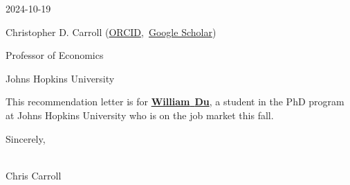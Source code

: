 \documentclass[titlepage, headings=optiontotocandhead]{article} %
\newcommand{\firstname}{William}
\newcommand{\lastname}{Du}
\begin{document}


\begin{flushright}
2024-10-19
\end{flushright}

\vspace*{-1mm}
\noindent Christopher D. Carroll (\href{https://orcid.org/0000-0003-3732-9312}{ORCID},~\href{https://scholar.google.com/citations?user=JY7jfgsAAAAJ}{Google Scholar})

\noindent Professor of Economics

\noindent Johns Hopkins University

\oddsidemargin 0in \textwidth 6.4in \topmargin 0in \textheight 8.8in
\pagestyle{empty}
\noindent
\small


\medskip\medskip
This recommendation letter is for \href{https://www.william-du.com}{\textbf{\firstname}~\textbf{\lastname}}, a student in the PhD program at Johns Hopkins University who is on the job market this fall.












\medskip\medskip\medskip

\noindent Sincerely,

\phantom{.}\\ 

\noindent Chris Carroll


\pagebreak
%
\end{document}
